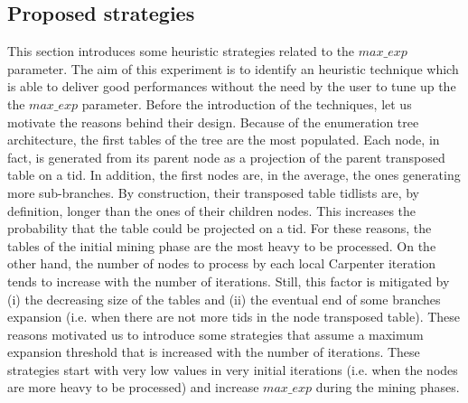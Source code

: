 \subsection{Proposed strategies}\label{exp_strategies}
This section introduces some heuristic strategies related to the $max\_exp$ parameter. 
The aim of this experiment is to identify an heuristic technique which is able to deliver good performances without the need by the user to tune up the the $max\_exp$ parameter.
Before the introduction of the techniques, let us motivate the reasons behind their design.
Because of the enumeration tree architecture, the first tables of the tree are the most populated. Each node, in fact, is generated from its parent node as a projection of the parent transposed table on a tid. 
In addition, the first nodes are, in the average, the ones generating more sub-branches. By construction, their transposed table tidlists are, by definition, longer than the ones of their children nodes. This increases the probability that the table could be projected on a tid.
For these reasons, the tables of the initial mining phase are the most heavy to be processed.
On the other hand, the number of nodes to process by each local Carpenter iteration tends to increase with the number of iterations. Still, this factor is mitigated by (i) the decreasing size of the tables and (ii) the eventual end of some branches expansion (i.e. when there are not more tids in the node transposed table).
These reasons motivated us to introduce some strategies that assume a maximum expansion threshold that is increased with the number of iterations. These strategies start with very low values in very initial iterations  (i.e. when the nodes are more heavy to be processed) and increase $max\_exp$ during the mining phases.

